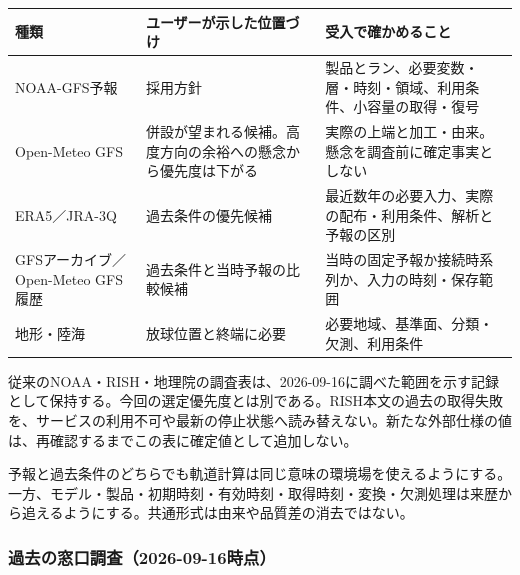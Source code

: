 \documentclass[11pt,a4paper]{article}
\newcounter{none}
\begin{document}
{\def\LTcaptype{none} %
\begin{longtable}[]{@{}
  >{\raggedright\arraybackslash}p{}
  >{\raggedright\arraybackslash}p{}
  >{\raggedright\arraybackslash}p{}@{}}
\toprule\noalign{}
\begin{minipage}[b]{\linewidth}\raggedright
種類
\end{minipage} & \begin{minipage}[b]{\linewidth}\raggedright
ユーザーが示した位置づけ
\end{minipage} & \begin{minipage}[b]{\linewidth}\raggedright
受入で確かめること
\end{minipage} \\
\midrule\noalign{}
\endhead
\bottomrule\noalign{}
\endlastfoot
NOAA-GFS予報 & 採用方針 &
製品とラン、必要変数・層・時刻・領域、利用条件、小容量の取得・復号 \\
Open-Meteo GFS &
併設が望まれる候補。高度方向の余裕への懸念から優先度は下がる &
実際の上端と加工・由来。懸念を調査前に確定事実としない \\
ERA5／JRA-3Q & 過去条件の優先候補 &
最近数年の必要入力、実際の配布・利用条件、解析と予報の区別 \\
GFSアーカイブ／Open-Meteo GFS履歴 & 過去条件と当時予報の比較候補 &
当時の固定予報か接続時系列か、入力の時刻・保存範囲 \\
地形・陸海 & 放球位置と終端に必要 &
必要地域、基準面、分類・欠測、利用条件 \\
\end{longtable}
}

従来のNOAA・RISH・地理院の調査表は、2026-09-16に調べた範囲を示す記録として保持する。今回の選定優先度とは別である。RISH本文の過去の取得失敗を、サービスの利用不可や最新の停止状態へ読み替えない。新たな外部仕様の値は、再確認するまでこの表に確定値として追加しない。

予報と過去条件のどちらでも軌道計算は同じ意味の環境場を使えるようにする。一方、モデル・製品・初期時刻・有効時刻・取得時刻・変換・欠測処理は来歴から追えるようにする。共通形式は由来や品質差の消去ではない。

\subsubsection{過去の窓口調査（2026-09-16時点）}\label{ux904eux53bbux306eux7a93ux53e3ux8abfux67fb2026-09-16ux6642ux70b9}
\end{document}
